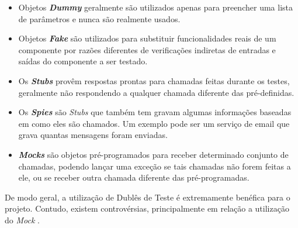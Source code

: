 \begin{itemize}
\item
Objetos \textbf{\textit{Dummy}} geralmente são utilizados apenas para preencher uma lista de parâmetros e nunca são realmente usados.

\item
Objetos \textbf{\textit{Fake}} são utilizados para substituir funcionalidades reais de um componente por razões diferentes de verificações indiretas de entradas e saídas do componente a ser   testado.

\item
Os \textbf{\textit{Stubs}} provêm respostas prontas para chamadas feitas durante os testes, geralmente não respondendo a qualquer   chamada diferente
das pré-definidas.

\item
Os \textbf{\textit{Spies}} são \textit{Stubs} que também tem gravam algumas informações baseadas em como eles são chamados. Um exemplo   pode ser um serviço de email que grava quantas mensagens foram   enviadas.

\item
\textbf{\textit{Mocks}} são objetos pré-programados para receber determinado conjunto de chamadas, podendo lançar uma exceção se tais chamadas não forem feitas a ele, ou se receber outra chamada diferente das pré-programadas.
\end{itemize}

De modo geral, a utilização de Dublês de Teste é extremamente benéfica para o projeto. Contudo, existem controvérsias, principalmente em relação a utilização do \textit{Mock} \cite{MocksArentStubs}.